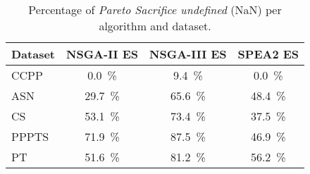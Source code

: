 \begin{table}[ht]
\centering
\caption{Percentage of \textit{Pareto Sacrifice undefined} (NaN) per algorithm and dataset.}
\label{tab:pareto_sacrifice_undefined_nsga-ii esnsga-iii esspea2 es}
\begin{tabular}{lccc}
\hline
Dataset & NSGA-II ES & NSGA-III ES & SPEA2 ES \\
\hline
CCPP & 0.0~\% & 9.4~\% & 0.0~\% \\
ASN & 29.7~\% & 65.6~\% & 48.4~\% \\
CS & 53.1~\% & 73.4~\% & 37.5~\% \\
PPPTS & 71.9~\% & 87.5~\% & 46.9~\% \\
PT & 51.6~\% & 81.2~\% & 56.2~\% \\
\hline
\end{tabular}
\end{table}